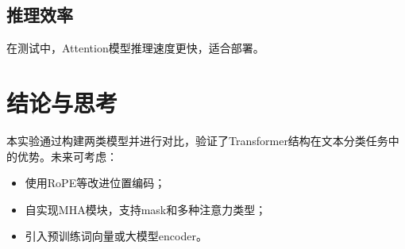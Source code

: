 \documentclass[11pt]{article}
\begin{document}
\subsection{推理效率}
在测试中，Attention模型推理速度更快，适合部署。

\section{结论与思考}
本实验通过构建两类模型并进行对比，验证了Transformer结构在文本分类任务中的优势。未来可考虑：
\begin{itemize}
    \item 使用RoPE等改进位置编码；
    \item 自实现MHA模块，支持mask和多种注意力类型；
    \item 引入预训练词向量或大模型encoder。
\end{itemize}
\end{document}
